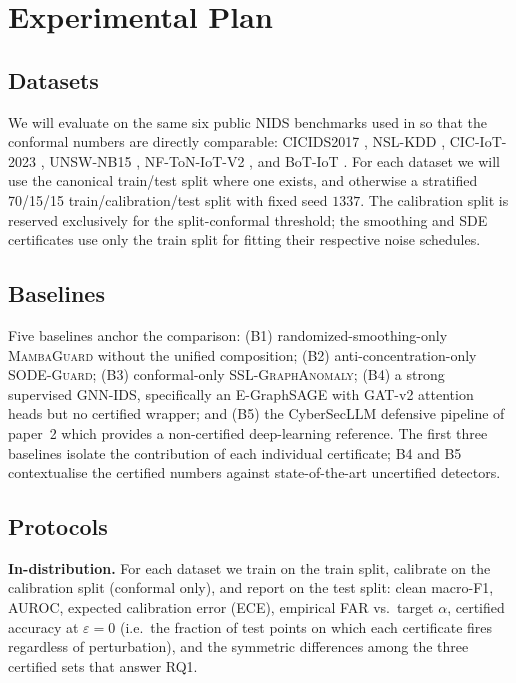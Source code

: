 \documentclass[journal,twoside]{IEEEtran}
\begin{document}
\section{Experimental Plan}\label{sec:experiments}

\subsection{Datasets}
We will evaluate on the same six public NIDS benchmarks used in
\cite{anaedevha2026sslgraph} so that the conformal numbers are directly
comparable: CICIDS2017 \cite{sharafaldin2018cicids}, NSL-KDD
\cite{tavallaee2009nslkdd}, CIC-IoT-2023 \cite{ciciot2023}, UNSW-NB15
\cite{moustafa2015unsw}, NF-ToN-IoT-V2 \cite{sarhan2022nftoniot}, and
BoT-IoT \cite{koroniotis2019botiot}. For each dataset we will use the
canonical train/test split where one exists, and otherwise a stratified
70/15/15 train/calibration/test split with fixed seed $1337$. The
calibration split is reserved exclusively for the split-conformal
threshold; the smoothing and SDE certificates use only the train split
for fitting their respective noise schedules.

\subsection{Baselines}
Five baselines anchor the comparison:
(B1) randomized-smoothing-only \textsc{MambaGuard} without the unified
composition;
(B2) anti-concentration-only \textsc{SODE-Guard};
(B3) conformal-only \textsc{SSL-GraphAnomaly};
(B4) a strong supervised GNN-IDS, specifically an E-GraphSAGE
\cite{lo2022} with GAT-v2 attention heads \cite{velickovic2018gat,
brody2022gatv2} but no certified wrapper; and
(B5) the CyberSecLLM defensive pipeline of paper~2
\cite{anaedevha2025llmsec} which provides a non-certified
deep-learning reference. The first three baselines isolate the
contribution of each individual certificate; B4 and B5 contextualise
the certified numbers against state-of-the-art uncertified detectors.

\subsection{Protocols}
\textbf{In-distribution.} For each dataset we train on the train split,
calibrate on the calibration split (conformal only), and report on the
test split: clean macro-F1, AUROC, expected calibration error (ECE),
empirical FAR vs.\ target $\alpha$, certified accuracy at
$\varepsilon=0$ (i.e.\ the fraction of test points on which each
certificate fires regardless of perturbation), and the symmetric
differences among the three certified sets that answer RQ1.
\end{document}
